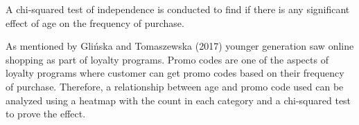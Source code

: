 \documentclass[
  letterpaper,
  DIV=11,
  numbers=noendperiod]{scrartcl}
\newenvironment{Shaded}{\begin{snugshade}}{\end{snugshade}}
\newcommand{\AttributeTok}[1]{\textcolor[rgb]{0.40,0.45,0.13}{#1}}
\newcommand{\CommentTok}[1]{\textcolor[rgb]{0.37,0.37,0.37}{#1}}
\newcommand{\FunctionTok}[1]{\textcolor[rgb]{0.28,0.35,0.67}{#1}}
\newcommand{\NormalTok}[1]{\textcolor[rgb]{0.00,0.23,0.31}{#1}}
\newcommand{\OtherTok}[1]{\textcolor[rgb]{0.00,0.23,0.31}{#1}}
\newcommand{\SpecialCharTok}[1]{\textcolor[rgb]{0.37,0.37,0.37}{#1}}
\newcommand{\StringTok}[1]{\textcolor[rgb]{0.13,0.47,0.30}{#1}}
\begin{document}
\begin{Shaded}
\end{Shaded}

A chi-squared test of independence is conducted to find if there is any
significant effect of age on the frequency of purchase.

\begin{Shaded}
\end{Shaded}

As mentioned by Glińska and Tomaszewska (2017) younger generation saw
online shopping as part of loyalty programs. Promo codes are one of the
aspects of loyalty programs where customer can get promo codes based on
their frequency of purchase. Therefore, a relationship between age and
promo code used can be analyzed using a heatmap with the count in each
category and a chi-squared test to prove the effect.
\end{document}
